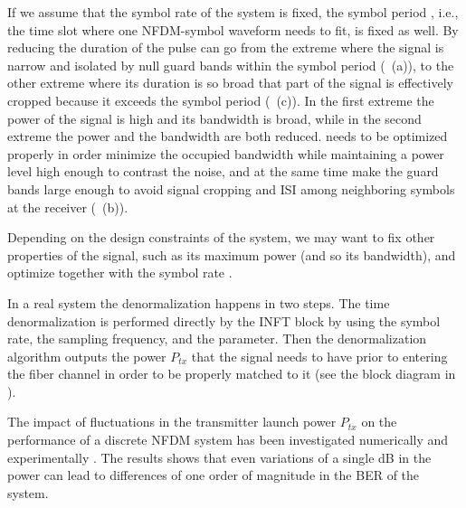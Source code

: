If we assume that the symbol rate \Rs{} of the system is fixed, the symbol
period \Ts{}, i.e., the time slot where one \ac{NFDM}-symbol waveform needs to fit, is
fixed as well.
By reducing \To{} the duration of the pulse can go from the extreme where the
signal is narrow and isolated by null guard bands within the symbol period \Ts
(~(a)), to the other extreme where its duration is
so broad that part of the signal is effectively cropped because it exceeds the
symbol period (~(c)). In the first extreme the power
of the signal is high
and its bandwidth is broad, while in the second extreme the power
and the bandwidth are both reduced. \To{} needs to be optimized properly in
order minimize the occupied bandwidth while maintaining a power level high
enough to contrast the noise, and at the same time make the guard bands large enough to avoid signal cropping and
\ac{ISI} among neighboring symbols at the receiver
(~(b)).

Depending on the design constraints of the system, we may want to fix other properties of the signal, such as its maximum power (and so its bandwidth), and optimize \To{} together with the symbol  rate \Rs.


In a real system the denormalization happens in two steps. The time
denormalization is performed directly by the \ac{INFT} block by using the symbol
rate, the sampling frequency, and the \To{} parameter. Then the denormalization
algorithm outputs the power $P_{tx}$ that the signal needs to have prior to entering the fiber channel in order to be properly matched to it (see the block diagram in ).

The impact of fluctuations in the transmitter launch power $P_{tx}$ on the performance of a discrete \ac{NFDM} system has been investigated numerically \cite{gui2016phase} and experimentally \cite{geisler2017influence}. The results shows that even variations of a single \si{dB} in the power can lead to differences of one order of magnitude in the \ac{BER} of the system.


